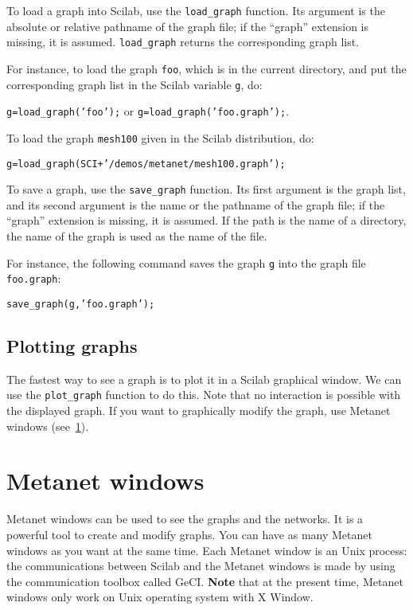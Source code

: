 \documentclass[11pt]{article}
\newcommand{\func}[1]{\texttt{#1}}
\begin{document}
To load a graph into Scilab, use the \func{load\_graph} function.
Its argument is the absolute or relative pathname of the
graph file; if the ``graph'' extension is missing, it is
assumed. \func{load\_graph} returns the corresponding graph list.

For instance, to load the graph \texttt{foo}, which is in the current
directory, and put the corresponding graph list in the Scilab variable
\texttt{g}, do:

\texttt{g=load\_graph('foo');} or \texttt{g=load\_graph('foo.graph');}.

To load the graph \texttt{mesh100} given in the Scilab distribution,
do:

\texttt{g=load\_graph(SCI+'/demos/metanet/mesh100.graph');}

\medskip

To save a graph, use the \func{save\_graph} function. Its first
argument is the graph list, and its second argument is the name or the
pathname of the graph file; if the ``graph'' extension is missing, it is 
assumed. If the path  is the name of a directory, the name of the graph is
used as the name of the file.

For instance, the following command saves the graph \texttt{g} into
the graph file \texttt{foo.graph}:

\texttt{save\_graph(g,'foo.graph');}

\subsection{Plotting graphs}\label{plotting}

The fastest way to see a graph is to plot it in a Scilab graphical
window. We can use the \func{plot\_graph} function to do this.
Note that no interaction is possible with the displayed graph. If you
want to graphically modify the graph, use Metanet windows
(see~\ref{xmetanet}).

\section{Metanet windows}\label{xmetanet}

Metanet windows can be used to see the graphs and the
networks. It is a powerful tool to create and modify
graphs. You can have as many Metanet windows as you want
at the same time. Each Metanet window is an Unix process: the
communications between Scilab and the Metanet windows is made by using
the communication toolbox called GeCI. \textbf{Note} that at the
present time, Metanet windows only work on Unix operating system with
X Window.
\end{document}
